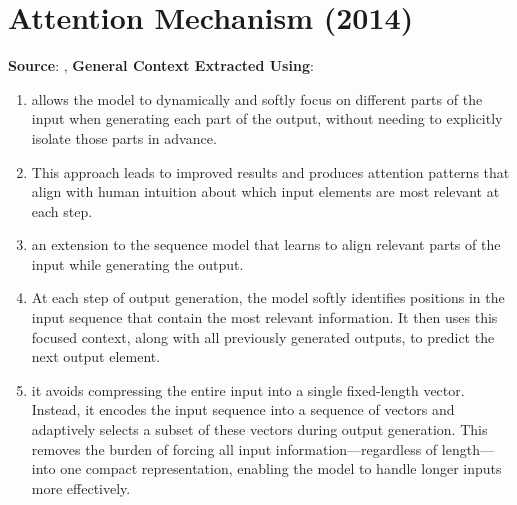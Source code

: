 \chapter{Attention Mechanism (2014)}

\begin{center}
    \textbf{Source}: \cite{adv-ml-tech/paper/arxiv.org/1409.0473}, 
    \textbf{General Context Extracted Using}: \cite{common/online/chatgpt}
\end{center}


\begin{enumerate}
    \item allows the model to dynamically and softly focus on different parts of the input when generating each part of the output, without needing to explicitly isolate those parts in advance. 
    \hfill \cite{adv-ml-tech/paper/arxiv.org/1409.0473, common/online/chatgpt}

    \item This approach leads to improved results and produces attention patterns that align with human intuition about which input elements are most relevant at each step.
    \hfill \cite{adv-ml-tech/paper/arxiv.org/1409.0473, common/online/chatgpt}

    \item an extension to the sequence model that learns to align relevant parts of the input while generating the output. 
    \hfill \cite{adv-ml-tech/paper/arxiv.org/1409.0473, common/online/chatgpt}

    \item At each step of output generation, the model softly identifies positions in the input sequence that contain the most relevant information.
    It then uses this focused context, along with all previously generated outputs, to predict the next output element.
    \hfill \cite{adv-ml-tech/paper/arxiv.org/1409.0473, common/online/chatgpt}

    \item it avoids compressing the entire input into a single fixed-length vector. Instead, it encodes the input sequence into a sequence of vectors and adaptively selects a subset of these vectors during output generation. 
    This removes the burden of forcing all input information—regardless of length—into one compact representation, enabling the model to handle longer inputs more effectively.
    \hfill \cite{adv-ml-tech/paper/arxiv.org/1409.0473, common/online/chatgpt}

    
\end{enumerate}


